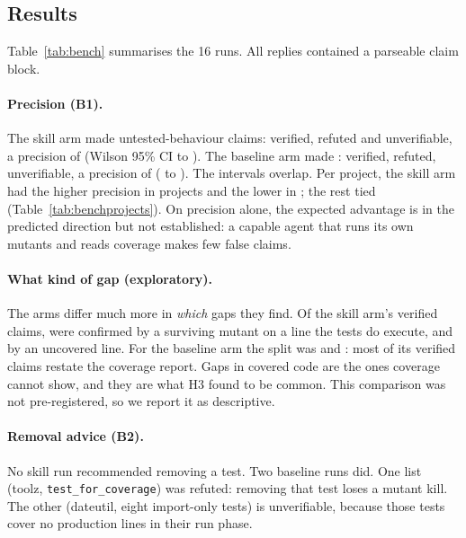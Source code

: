 \subsection{Results}



Table~\ref{tab:bench} summarises the 16 runs. All replies contained a parseable claim block.

\paragraph{Precision (B1).} The skill arm made \BenchSkillClaims{} untested-behaviour claims: \BenchSkillVerified{} verified, \BenchSkillRefuted{} refuted and \BenchSkillUnverifiable{} unverifiable, a precision of \BenchSkillPrecision{} (Wilson 95\% CI \BenchSkillPrecisionLo{} to \BenchSkillPrecisionHi{}). The baseline arm made \BenchBaseClaims{}: \BenchBaseVerified{} verified, \BenchBaseRefuted{} refuted, \BenchBaseUnverifiable{} unverifiable, a precision of \BenchBasePrecision{} (\BenchBasePrecisionLo{} to \BenchBasePrecisionHi{}). The intervals overlap. Per project, the skill arm had the higher precision in \BenchPairedBetter{} projects and the lower in \BenchPairedWorse{}; the rest tied (Table~\ref{tab:benchprojects}). On precision alone, the expected advantage is in the predicted direction but not established: a capable agent that runs its own mutants and reads coverage makes few false claims.



\paragraph{What kind of gap (exploratory).} The arms differ much more in \emph{which} gaps they find. Of the skill arm's verified claims, \BenchSkillVerifiedMutant{} were confirmed by a surviving mutant on a line the tests do execute, and \BenchSkillVerifiedUncovered{} by an uncovered line. For the baseline arm the split was \BenchBaseVerifiedMutant{} and \BenchBaseVerifiedUncovered{}: most of its verified claims restate the coverage report. Gaps in covered code are the ones coverage cannot show, and they are what H3 found to be common. This comparison was not pre-registered, so we report it as descriptive.

\paragraph{Removal advice (B2).} No skill run recommended removing a test. Two baseline runs did. One list (toolz, \texttt{test\_for\_coverage}) was refuted: removing that test loses a mutant kill. The other (dateutil, eight import-only tests) is unverifiable, because those tests cover no production lines in their run phase.

